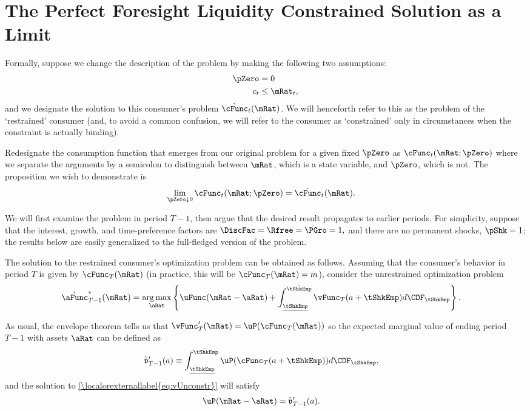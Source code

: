 \documentclass[\econtexRoot/BufferStockTheory]{subfiles}
\begin{document}
  \section{The Perfect Foresight Liquidity Constrained Solution as a Limit}
\label{sec:LiqConstrAsLimit}

Formally, suppose we change the description of the problem by making
the following two assumptions:
\begin{eqnarray*}
    \pZero   & = 0
\\  c_{t} & \leq  \mRat_{t} \label{eq:liqconstr},
\end{eqnarray*}
and we designate the solution to this consumer's problem
$\grave{\cFunc}_{t}(\mRat)$.  We will henceforth refer to this as the
problem of the `restrained' consumer (and, to avoid a common
confusion, we will refer to the consumer as `constrained' only in
circumstances when the constraint is actually binding).

Redesignate the consumption function that emerges from our original
problem for a given fixed $\pZero$ as $\cFunc_{t}(\mRat;\pZero)$ where we
separate the arguments by a semicolon to distinguish between $\mRat$,
which is a state variable, and $\pZero$, which is not.  The
proposition we wish to demonstrate is
\begin{align}
  \lim_{\pZero \downarrow 0} \cFunc_{t}(\mRat;\pZero)  & = \grave{\cFunc}_{t}(\mRat). \label{eq:RestrEqUnrestr} 
\end{align}

We will first examine the problem in period $T-1$, then
argue that the desired result propagates to earlier periods.
For simplicity, suppose that the interest, growth, and time-preference
factors are $\DiscFac = \Rfree = \PGro = 1,$ and there are no permanent
shocks, $\pShk=1$; the results below are easily generalized
to the full-fledged version of the problem.

The solution to the restrained consumer's optimization problem can be
obtained as follows.  Assuming that the consumer's behavior in period
$T$ is given by $\cFunc_{T}(\mRat)$ (in practice, this will be
$\cFunc_{T}(\mRat)=m$), consider the unrestrained optimization problem
\begin{align}
  \grave{\aFunc}^{*}_{T-1}(\mRat)  & = \underset{\aRat}{\arg \max} \left\{\uFunc(\mRat-\aRat) +  \int_{\underline{\tShkEmp}}^{\bar{\tShkEmp}} \vFunc_{T}(a+\tShkEmp) d\CDF_{\tShkEmp} \right\}. \label{eq:vUnconstr}
\end{align}

As usual, the envelope theorem tells us that
$\vFunc_{T}^{\prime}(\mRat)=\uP(\cFunc_{T}(\mRat))$ so the expected marginal
value of ending period $T-1$ with assets $\aRat$ can be defined as
\begin{align}
  \grave{\mathfrak{v}}_{T-1}^{\prime}(a)  & \equiv  \int_{\underline{\tShkEmp}}^{\bar{\tShkEmp}} \uP(\cFunc_{T}(a+\tShkEmp)) d\CDF_{\tShkEmp}, \notag
\end{align}
and the solution to \eqref{\localorexternallabel{eq:vUnconstr}} will satisfy
\begin{align}
  \uP(\mRat-\aRat)  & =  \grave{\mathfrak{v}}_{T-1}^{\prime}(a) \label{eq:uPConstr}.
%
\end{align}
\end{document}
